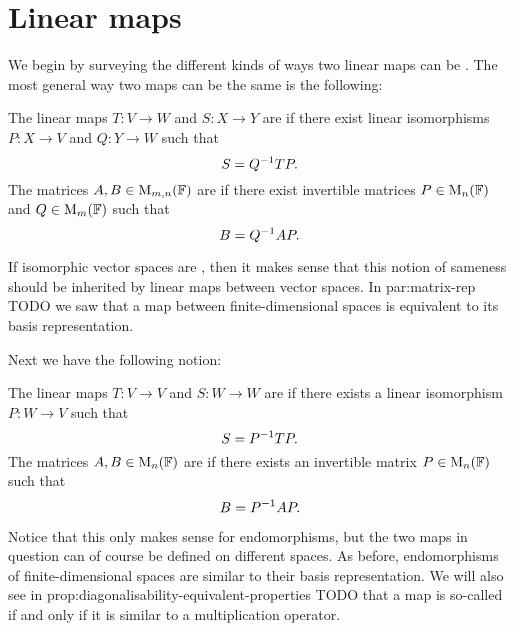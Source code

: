 

\section{Linear maps}

We begin by surveying the different kinds of ways two linear maps can be . The most general way two maps can be the same is the following:
%
\begin{definition}
    The linear maps $T \colon V \to W$ and $S \colon X \to Y$ are  if there exist linear isomorphisms $P \colon X \to V$ and $Q \colon Y \to W$ such that
    \begin{equation*}
        S = Q^{-1} TP.
    \end{equation*}
    The matrices $A,B \in \mathrm{M}_{m,n}(\mathbb{F})$ are  if there exist invertible matrices $P \in \mathrm{M}_{n}(\mathbb{F})$ and $Q \in \mathrm{M}_{m}(\mathbb{F})$ such that
    \begin{equation*}
        B
            = Q^{-1} AP.
    \end{equation*}
\end{definition}
%
If isomorphic vector spaces are , then it makes sense that this notion of sameness should be inherited by linear maps between vector spaces. In {par:matrix-rep} TODO we saw that a map between finite-dimensional spaces is equivalent to its basis representation.

Next we have the following notion:
%
\begin{definition}
    The linear maps $T \colon V \to V$ and $S \colon W \to W$ are  if there exists a linear isomorphism $P \colon W \to V$ such that
    \begin{equation*}
        S = P^{-1} TP.
    \end{equation*}
    The matrices $A,B \in \mathrm{M}_{n}(\mathbb{F})$ are  if there exists an invertible matrix $P \in \mathrm{M}_{n}(\mathbb{F})$ such that
    \begin{equation*}
        B
            = P^{-1} AP.
    \end{equation*}
\end{definition}
%
Notice that this only makes sense for endomorphisms, but the two maps in question can of course be defined on different spaces. As before, endomorphisms of finite-dimensional spaces are similar to their basis representation. We will also see in {prop:diagonalisability-equivalent-properties} TODO that a map is so-called  if and only if it is similar to a multiplication operator.

